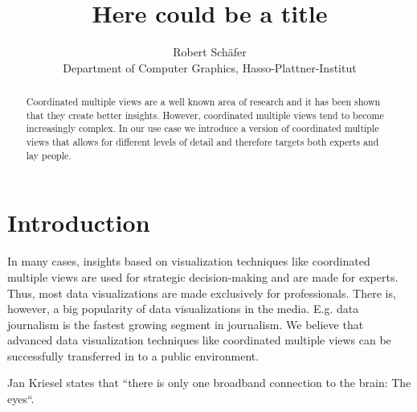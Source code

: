 \documentclass{article}
\begin{document}
\title{Here could be a title}\label{here-could-be-a-title}
\author{Robert Schäfer\\ Department of Computer Graphics, Hasso-Plattner-Institut}
\maketitle

\begin{abstract}
Coordinated multiple views are a well known area of research and it has
been shown that they create better insights. However, coordinated
multiple views tend to become increasingly complex. In our use case we
introduce a version of coordinated multiple views that allows for
different levels of detail and therefore targets both experts and lay
people.
\end{abstract}

\section{Introduction}
In many cases, insights based on visualization techniques like
coordinated multiple views are used for strategic decision-making and
are made for experts. Thus, most data visualizations are made
exclusively for professionals. There is, however, a big popularity of
data visualizations in the media. E.g. data journalism is the fastest
growing segment in journalism. We believe that advanced data
visualization techniques like coordinated multiple views can be
successfully transferred in to a public environment.

Jan Kriesel states that ``there is only one broadband connection to the
brain: The eyes``.
\end{document}
